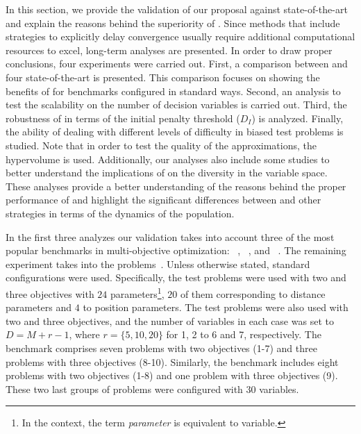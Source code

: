In this section, we provide the validation of our proposal against state-of-the-art \MOEAS{} and explain the reasons behind the superiority of \AVSDMOEAD{}.
%
Since methods that include strategies to explicitly delay convergence usually require additional computational
resources to excel, long-term analyses are presented.
%
In order to draw proper conclusions, four experiments were carried out.
%
First, a comparison between \AVSDMOEAD{} and four state-of-the-art \MOEAS{} is presented.
%
This comparison focuses on showing the benefits of \AVSDMOEAD{} for benchmarks configured in standard ways.
%
Second, an analysis to test the scalability on the number of decision variables is carried out.
%
Third, the robustness of \AVSDMOEAD{} in terms of the initial penalty threshold ($D_I$) is analyzed.
%
Finally, the ability of dealing with different levels of difficulty in biased test problems is studied.
%
Note that in order to test the quality of the approximations, the hypervolume is used.
%
Additionally, our analyses also include some studies to better understand
the implications of \AVSDMOEAD{} on the diversity in the variable space.
%
These analyses provide a better understanding of the reasons behind the proper performance of \AVSDMOEAD{}
and highlight the significant differences between \AVSDMOEAD{} and other strategies in terms of the dynamics
of the population.


In the first three analyzes our validation takes into account three of the most popular benchmarks in multi-objective optimization:
\WFG{}~\cite{huband2006review}, \DTLZ{}~\cite{deb2005scalable}, and \UF{}~\cite{zhang2008multiobjective}.
%
The remaining experiment takes into the \BT{} problems~\cite{li2016biased}.
%
Unless otherwise stated, standard configurations were used.
%
Specifically, the \WFG{} test problems were used with two and three objectives with $24$ 
parameters\footnote{In the \WFG{} context, the term \textit{parameter} is equivalent to variable.}, 
$20$ of them corresponding to distance parameters and $4$ to position parameters.
%
The \DTLZ{} test problems were also used with two and three objectives, and the number of variables in each
case was set to $D=M+r-1$, where $r=\{5, 10, 20\}$ for \DTLZ{}1, \DTLZ{}2 to \DTLZ{}6 and \DTLZ{}7, respectively.
% 
The \UF{} benchmark comprises seven problems with two objectives (\UF{}1-7) and three problems with three objectives (\UF{}8-10).
%
Similarly, the \BT{} benchmark includes eight problems with two objectives (\BT{}1-8) and one problem with three objectives (\BT{}9).
%
These two last groups of problems were configured with $30$ variables.

